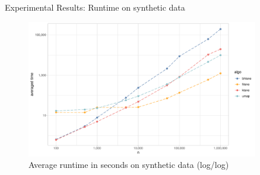 \documentclass{beamer}
\begin{document}
\begin{frame}[fragile]{Experimental Results: Runtime on synthetic data}
  \begin{figure}[h]
      \centering
      \includegraphics[width=0.9\textwidth]{runtime_comparison}
  \caption{Average runtime in seconds on synthetic data (log/log)}
  \end{figure}
\end{frame}

\end{document}
